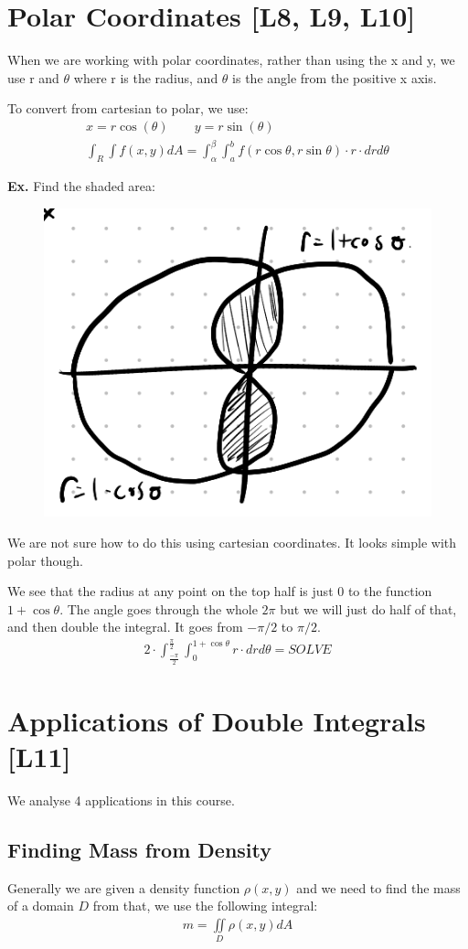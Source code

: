 \documentclass[12pt,letterpaper]{article} \usepackage{amsmath} \usepackage{graphicx} \usepackage[margin=1in]{geometry} \usepackage{longtable}  \usepackage{amssymb}
\begin{document}
	\section{Polar Coordinates [L8, L9, L10]}
	When we are working with polar coordinates, rather than using the x and y, we use r and $\theta$ where r is the radius, and $\theta$ is the angle from the positive x axis. 
	
	To convert from cartesian to polar, we use:
	\begin{align*}
		x = r\cos(\theta) \qquad y = r\sin(\theta)\\
		\int_R \int f(x,y) dA = \int^{\beta} _{\alpha} \int^b_a f(r\cos\theta,r\sin\theta)\cdot r\cdot drd\theta
	\end{align*}
	
	\begin{mdframed}[]
		\textbf{Ex. } Find the shaded area:
		\begin{figure}[H]
			\centering
			\includegraphics[width=0.4\linewidth]{figure.png}
		\end{figure}
	
		We are not sure how to do this using cartesian coordinates. It looks simple with polar though.
		
		We see that the radius at any point on the top half is just 0 to the function $1+\cos\theta$. The angle goes through the whole $2\pi$ but we will just do half of that, and then double the integral. It goes from $-\pi/2$ to $\pi/2$.
		\begin{align*}
			2\cdot \int^{\frac{\pi}{2}}_\frac{-\pi}{2} \int_0^{1+\cos\theta} r\cdot drd\theta = SOLVE
		\end{align*}
	\end{mdframed}

	
	\section{Applications of Double Integrals [L11]}
	
	We analyse 4 applications in this course.
	
	\subsection{Finding Mass from Density}
	Generally we are given a density function $\rho (x,y)$ and we need to find the mass of a domain $D$ from that, we use the following integral:
	\begin{align*}
		m = \iint\limits_D \rho(x,y) dA
	\end{align*}
	
\end{document}
